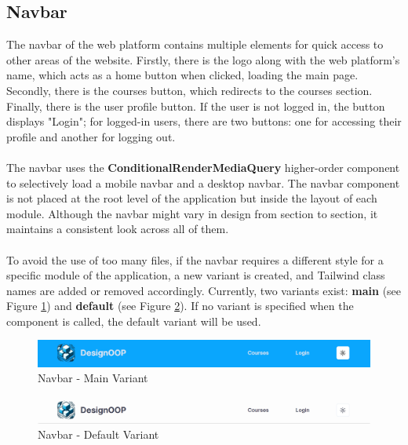 \subsection{Navbar}

\noindent The navbar of the web platform contains multiple elements for quick access to other areas of the website. Firstly, there is the logo along with the web platform's name, which acts as a home button when clicked, loading the main page. Secondly, there is the courses button, which redirects to the courses section. Finally, there is the user profile button. If the user is not logged in, the button displays "Login"; for logged-in users, there are two buttons: one for accessing their profile and another for logging out.
\\\\
\noindent The navbar uses the \textbf{ConditionalRenderMediaQuery} higher-order component to selectively load a mobile navbar and a desktop navbar. The navbar component is not placed at the root level of the application but inside the layout of each module. Although the navbar might vary in design from section to section, it maintains a consistent look across all of them.
\\\\
\noindent To avoid the use of too many files, if the navbar requires a different style for a specific module of the application, a new variant is created, and Tailwind class names are added or removed accordingly. Currently, two variants exist: \textbf{main} (see Figure \ref{fig:navbar-main}) and \textbf{default} (see Figure \ref{fig:navbar-default}). If no variant is specified when the component is called, the default variant will be used.

\begin{figure}[h]
    \centering
    \includegraphics[scale=0.55]{images/navbar-main.png}
    \caption{Navbar - Main Variant}
    \label{fig:navbar-main}
\end{figure}

\begin{figure}[h]
    \centering
    \includegraphics[scale=0.55]{images/navbar-default.png}
    \caption{Navbar - Default Variant}
    \label{fig:navbar-default}
\end{figure}

